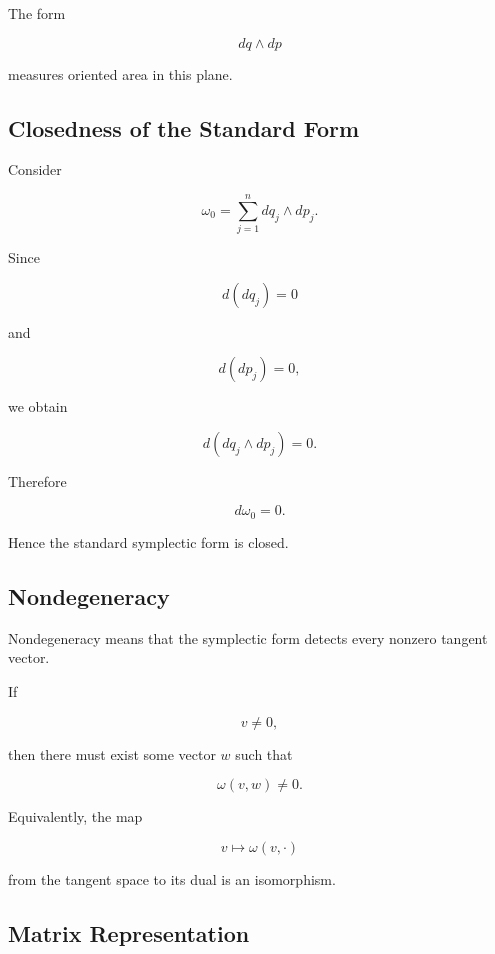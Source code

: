 The form

\[
dq\wedge dp
\]

measures oriented area in this plane.

\subsection{Closedness of the Standard Form}
\label{subsec:standard-form-closed}

Consider

\[
\omega_0
=
\sum_{j=1}^{n}
dq_j\wedge dp_j.
\]

Since

\[
d(dq_j)=0
\]

and

\[
d(dp_j)=0,
\]

we obtain

\[
d(dq_j\wedge dp_j)=0.
\]

Therefore

\[
\boxed{
d\omega_0=0.
}
\]

Hence the standard symplectic form is closed.

\subsection{Nondegeneracy}
\label{subsec:symplectic-nondegeneracy}

Nondegeneracy means that the symplectic form detects every nonzero tangent
vector.

If

\[
v\neq0,
\]

then there must exist some vector \(w\) such that

\[
\boxed{
\omega(v,w)\neq0.
}
\]

Equivalently, the map

\[
\boxed{
v\longmapsto\omega(v,\cdot)
}
\]

from the tangent space to its dual is an isomorphism.

\subsection{Matrix Representation}
\label{subsec:symplectic-matrix-representation}

